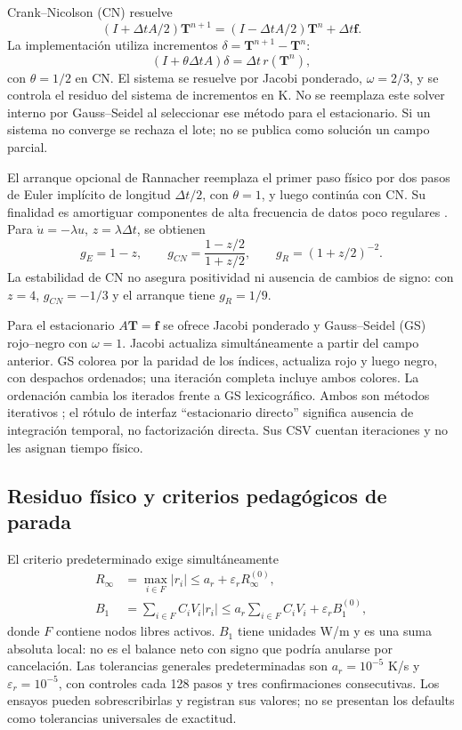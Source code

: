 \documentclass[11pt,a4paper]{article}
\newcommand{\dt}{\Delta t}
\begin{document}
Crank--Nicolson (CN) \cite{crank} resuelve
\begin{equation}
 (I+\dt A/2)\mathbf T^{n+1}=(I-\dt A/2)\mathbf T^n+\dt\mathbf f.
\end{equation}
La implementación utiliza incrementos $\delta=\mathbf T^{n+1}-\mathbf T^n$:
\begin{equation}
 (I+\theta\dt A)\delta=\dt\,r(\mathbf T^n),
 \label{eq:increment}
\end{equation}
con $\theta=1/2$ en CN. El sistema se resuelve por Jacobi ponderado, $\omega=2/3$, y se controla el residuo del sistema de incrementos en K. No se reemplaza este solver interno por Gauss--Seidel al seleccionar ese método para el estacionario. Si un sistema no converge se rechaza el lote; no se publica como solución un campo parcial.

El arranque opcional de Rannacher reemplaza el primer paso físico por dos pasos de Euler implícito de longitud $\dt/2$, con $\theta=1$, y luego continúa con CN. Su finalidad es amortiguar componentes de alta frecuencia de datos poco regulares \cite{rannacher}. Para $\dot u=-\lambda u$, $z=\lambda\dt$, se obtienen
\begin{equation}
 g_E=1-z,\qquad g_{CN}=\frac{1-z/2}{1+z/2},\qquad g_R=(1+z/2)^{-2}.
 \label{eq:gains}
\end{equation}
La estabilidad de CN no asegura positividad ni ausencia de cambios de signo: con $z=4$, $g_{CN}=-1/3$ y el arranque tiene $g_R=1/9$.

Para el estacionario $A\mathbf T=\mathbf f$ se ofrece Jacobi ponderado y Gauss--Seidel (GS) rojo--negro con $\omega=1$. Jacobi actualiza simultáneamente a partir del campo anterior. GS colorea por la paridad de los índices, actualiza rojo y luego negro, con despachos ordenados; una iteración completa incluye ambos colores. La ordenación cambia los iterados frente a GS lexicográfico. Ambos son métodos iterativos \cite{templates}; el rótulo de interfaz ``estacionario directo'' significa ausencia de integración temporal, no factorización directa. Sus CSV cuentan iteraciones y no les asignan tiempo físico.

\subsection{Residuo físico y criterios pedagógicos de parada}
El criterio predeterminado exige simultáneamente
\begin{align}
 R_\infty&=\max_{i\in F}|r_i|\leq a_r+\varepsilon_rR_\infty^{(0)},\\
 B_1&=\sum_{i\in F}C_iV_i|r_i|\leq a_r\sum_{i\in F}C_iV_i+\varepsilon_rB_1^{(0)},
 \label{eq:residual}
\end{align}
donde $F$ contiene nodos libres activos. $B_1$ tiene unidades W/m y es una suma absoluta local: no es el balance neto con signo que podría anularse por cancelación. Las tolerancias generales predeterminadas son $a_r=10^{-5}$ K/s y $\varepsilon_r=10^{-5}$, con controles cada 128 pasos y tres confirmaciones consecutivas. Los ensayos pueden sobrescribirlas y registran sus valores; no se presentan los defaults como tolerancias universales de exactitud.
\end{document}
